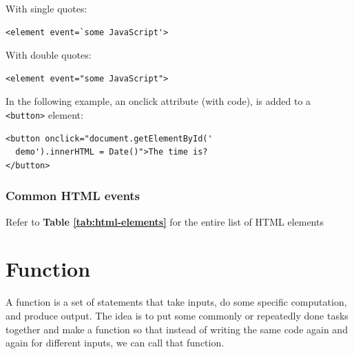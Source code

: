 \documentclass[twocolumn, a4paper]{article}
\begin{document}
\vskip10pt
\noindent With single quotes:
\begin{verbatim}
<element event=`some JavaScript'>
\end{verbatim}
With double quotes:
\begin{verbatim}
<element event="some JavaScript">
\end{verbatim}
In the following example, an onclick attribute (with code), is added to a
\verb+<button>+ element:
\begin{small}
  \begin{verbatim}
<button onclick="document.getElementById('
  demo').innerHTML = Date()">The time is?
</button>
  \end{verbatim}
\end{small}

\subsubsection{Common HTML events}
Refer to \textbf{Table \ref{tab:html-elements}} for the entire list of HTML
elements
\begin{table}
  \caption{Common HTML events}
  \label{tab:html-elements}
\end{table}


\section{Function}
A function is a set of statements that take inputs, do some specific
computation, and produce output. The idea is to put some commonly or
repeatedly done tasks together and make a function so that instead of writing 
the same code again and again for different inputs, we can call that function.
\end{document}
